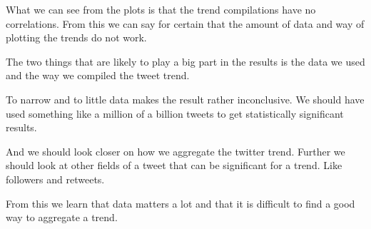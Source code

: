 What we can see from the plots is that the trend compilations have no
correlations. From this we can say for certain that the amount of data and way
of plotting the trends do not work.

The two things that are likely to play a big part in the results is the data we
used and the way we compiled the tweet trend. 

To narrow and to little data makes the result rather inconclusive. We should have
used something like a million of a billion tweets to get statistically
significant results.

And we should look closer on how we aggregate the twitter trend. Further we
should look at other fields of a tweet that can be significant for a trend. Like
followers and retweets.

From this we learn that data matters a lot and that it is difficult to find a
good way to aggregate a trend. 
%
